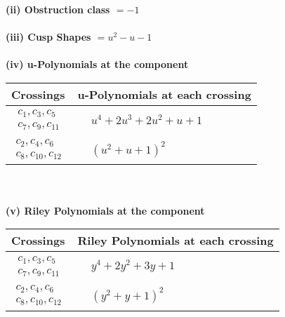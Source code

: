 \documentclass[1p]{elsarticle_modified}
\theoremstyle{definition}
\begin{document}
\flushleft \textbf{(ii) Obstruction class $= -1$}\\~\\
\flushleft \textbf{(iii) Cusp Shapes $= u^2- u-1$}\\~\\
\newpage\renewcommand{\arraystretch}{1}
\flushleft \textbf{(iv) u-Polynomials at the component}\newline \\
\begin{tabular}{m{50pt}|m{274pt}}
Crossings & \hspace{64pt}u-Polynomials at each crossing \\
\hline $$\begin{aligned}c_{1},c_{3},c_{5}\\c_{7},c_{9},c_{11}\end{aligned}$$&$\begin{aligned}
&u^4+2 u^3+2 u^2+u+1
\end{aligned}$\\
\hline $$\begin{aligned}c_{2},c_{4},c_{6}\\c_{8},c_{10},c_{12}\end{aligned}$$&$\begin{aligned}
&(u^2+u+1)^2
\end{aligned}$\\
\hline
\end{tabular}\\~\\
\newpage\renewcommand{\arraystretch}{1}
\flushleft \textbf{(v) Riley Polynomials at the component}\newline \\
\begin{tabular}{m{50pt}|m{274pt}}
Crossings & \hspace{64pt}Riley Polynomials at each crossing \\
\hline $$\begin{aligned}c_{1},c_{3},c_{5}\\c_{7},c_{9},c_{11}\end{aligned}$$&$\begin{aligned}
&y^4+2 y^2+3 y+1
\end{aligned}$\\
\hline $$\begin{aligned}c_{2},c_{4},c_{6}\\c_{8},c_{10},c_{12}\end{aligned}$$&$\begin{aligned}
&(y^2+y+1)^2
\end{aligned}$\\
\hline
\end{tabular}\\~\\
\end{document}
